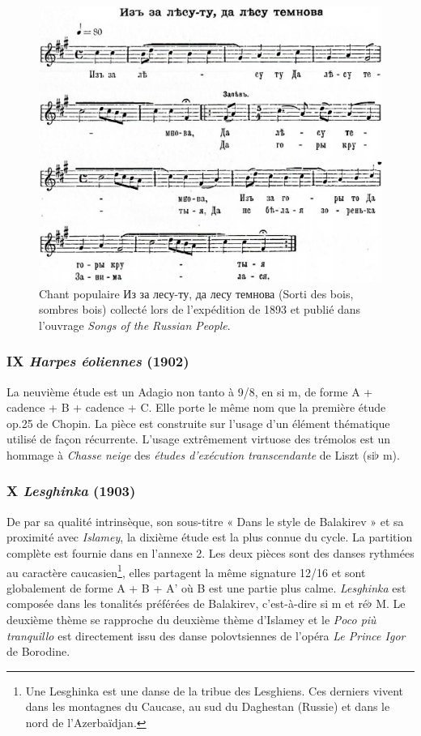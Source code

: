 \begin{figure}[!ht]
  \begin{bigcenter}
    \includegraphics[width=15.0cm, keepaspectratio]{woods.png}
  \end{bigcenter}
  \caption{\label{woods}Chant populaire \foreignlanguage{russian}{Из за лесу-ту, да лесу темнова} (Sorti des bois, sombres bois) collecté lors de l'expédition de 1893 et publié dans l'ouvrage \emph{Songs of the Russian People}.}
\end{figure}

\subsubsection{IX \emph{Harpes éoliennes} (1902)}

La neuvième étude est un Adagio non tanto à 9/8, en si m, de forme A + cadence + B + cadence + C. Elle porte le même nom que la première étude op.25 de Chopin. La pièce est construite sur l'usage d'un élément thématique utilisé de façon récurrente. L'usage extrêmement virtuose des trémolos est un hommage à \emph{Chasse neige} des \emph{études d'exécution transcendante} de Liszt (si$\flat$ m).

\subsubsection{X \emph{Lesghinka} (1903)}

De par sa qualité intrinsèque, son sous-titre « Dans le style de Balakirev » et sa proximité avec \emph{Islamey}, la dixième étude est la plus connue du cycle. La partition complète est fournie dans en l'annexe 2. Les deux pièces sont des danses rythmées au caractère caucasien\footnote{Une Lesghinka est une danse de la tribue des Lesghiens. Ces derniers vivent dans les montagnes du Caucase, au sud du Daghestan (Russie) et dans le nord de l'Azerbaïdjan.}, elles partagent la même signature 12/16 et sont globalement de forme A + B + A' où B est une partie plus calme. \emph{Lesghinka} est composée dans les tonalités préférées de Balakirev, c'est-à-dire si m et ré$\flat$ M. Le deuxième thème se rapproche du deuxième thème d'Islamey et le \emph{Poco pi\`{u} tranquillo} est directement issu des danse polovtsiennes de l'opéra \emph{Le Prince Igor} de Borodine.

